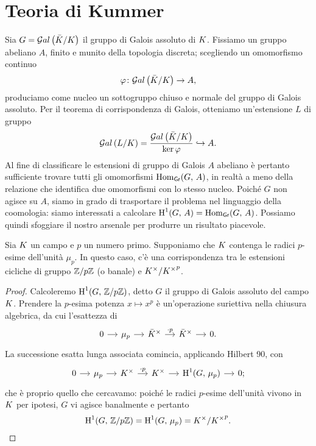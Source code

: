 \section{Teoria di Kummer}


Sia $ G = \mathcal{G}al\left( \bar{K}/ K \right) $ il gruppo di Galois assoluto di $ K $. Fissiamo un gruppo abeliano $ A $, finito e munito della topologia discreta; scegliendo un omomorfismo continuo
\[ \varphi \colon \mathcal{G}al\left( \bar{K}/ K \right) \to A, \]
produciamo come nucleo un sottogruppo chiuso e normale del gruppo di Galois assoluto. Per il teorema di corrispondenza di Galois, otteniamo un'estensione $ L $ di gruppo
\[ \mathcal{G}al\left( L/K \right) = \frac{\mathcal{G}al\left( \bar{K}/ K \right)}{\ker \varphi} \hookrightarrow A. \]
Al fine di classificare le estensioni di gruppo di Galois $ A $ abeliano è pertanto sufficiente trovare tutti gli omomorfismi $ \operatorname{Hom}_{\textsf{Gr}}(G, \, A) $, in realtà a meno della relazione che identifica due omomorfismi con lo stesso nucleo. Poiché $ G $ non agisce su $ A $, siamo in grado di trasportare il problema nel linguaggio della coomologia: siamo interessati a calcolare $ \operatorname{H}^1(G, \, A) = \operatorname{Hom}_{\textsf{Gr}}(G, \, A) $. Possiamo quindi sfoggiare il nostro arsenale per produrre un risultato piacevole.

\begin{theorem}[di Kummer]
	Sia $ K $ un campo e $ p $ un numero primo. Supponiamo che $ K $ contenga le radici $ p $-esime dell'unità $ \mu_p $. In questo caso, c'è una corrispondenza tra le estensioni cicliche di gruppo $ \mathbb{Z}/p\mathbb{Z} $ (o banale) e $ K^\times / {K^\times}^p $.
\end{theorem}
\begin{proof}
	Calcoleremo $ \operatorname{H}^1(G, \, \mathbb{Z}/p\mathbb{Z}) $, detto $ G $ il gruppo di Galois assoluto del campo $ K $. Prendere la $ p $-esima potenza $ x \mapsto x^p $ è un'operazione suriettiva nella chiusura algebrica, da cui l'esattezza di
	\[\begin{tikzcd}[column sep = small]
	0 \rar
	& \mu_p \rar
	& \bar{\K}^\times \rar["\cdot p"]
	& \bar{\K}^\times \rar
	& 0.
	\end{tikzcd}  \]
	La successione esatta lunga associata comincia, applicando Hilbert 90, con
	\[\begin{tikzcd}[column sep = small]
	0 \rar
	& \mu_p \rar
	& \K^\times \rar["\cdot p"]
	& \K^\times \rar
	& \HH^1(G, \, \mu_p) \rar
	& 0;
	\end{tikzcd}  \]
	che è proprio quello che cercavamo: poiché le radici $ p $-esime dell'unità vivono in $ K $ per ipotesi, $ G $ vi agisce banalmente e pertanto
	\[ \operatorname{H}^1(G, \, \mathbb{Z}/p\mathbb{Z}) = \operatorname{H}^1(G, \, \mu_p) =K^\times / {K^\times}^p . \]
\end{proof}

